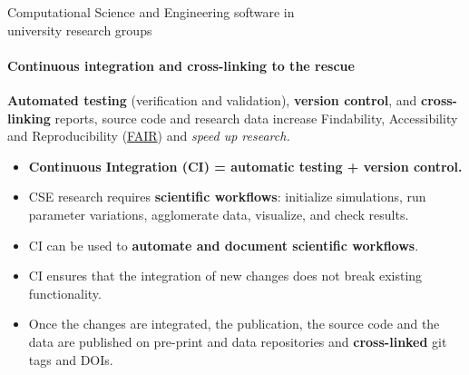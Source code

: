 \begin{frame}{Computational Science and Engineering software in\\university research groups}
    \framesubtitle{Continuous integration and cross-linking to the rescue}
    \vfill

    \textbf{Automated testing} (verification and validation), \textbf{version control}, and \textbf{cross-linking} reports, source code and research data increase Findability, Accessibility and Reproducibility (\href{ https://www.go-fair.org/fair-principles}{FAIR}) and \emph{speed up research.} 

    \begin{itemize}

        \item \textbf{Continuous Integration (CI) = automatic testing + version control.}

        \item CSE research requires \textbf{scientific workflows}: initialize simulations, run parameter variations, agglomerate data, visualize, and check results.  
        \item CI can be used to \textbf{automate and document scientific workflows}. 
        \item CI ensures that the integration of new changes does not break existing functionality.
        \item Once the changes are integrated, the publication, the source code and the data are published on pre-print and data repositories and \textbf{cross-linked} git tags and DOIs. 
    \end{itemize}

\end{frame}

